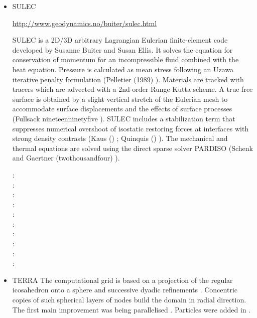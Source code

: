 \begin{itemize}
\item {\codefont SULEC} 

\url{http://www.geodynamics.no/buiter/sulec.html}

SULEC is a 2D/3D arbitrary Lagrangian Eulerian finite-element code developed by Susanne Buiter and Susan Ellis. 
It solves the equation for conservation of momentum for an incompressible fluid combined with 
the heat equation. Pressure is calculated as mean stress following an Uzawa iterative penalty 
formulation (Pelletier \etal (1989) \cite{pefc89}). 
Materials are tracked with tracers which are advected with a 2nd-order Runge-Kutta scheme. 
A true free surface is obtained by a slight vertical stretch of the Eulerian mesh to 
accommodate surface displacements and the effects of surface processes (Fullsack nineteenninetyfive \cite{full95}). 
SULEC includes a stabilization term that suppresses numerical overshoot of isostatic restoring forces 
at interfaces with strong density contrasts (Kaus \etal (\twothousandten) \cite{kamm10}; 
Quinquis \etal (\twothousandeleven) \cite{qube11}). The mechanical and thermal equations are solved using 
the direct sparse solver PARDISO (Schenk and Gaertner (twothousandfour) \cite{scga04}).


\begin{scriptsize}
\twothousandeleven: \cite{qube11}\cite{ellw11}\\
\twothousandtwelve: \cite{buit12}\cite{tebu12}\cite{crsg12}\cite{grel12}\\
\twothousandthirteen: \cite{ghbu13}\\
\twothousandfourteen: \cite{ghbu14}\cite{qubu14}\\
\twothousandfifteen: \cite{nabu15}\\
\twothousandsixteen: \cite{zwsn16}\\
\twothousandseventeen: \cite{nabp17}\\
\twothousandeighteen: \cite{tebu18}\\
\twothousandnineteen: \cite{elgb19}\\
\twothousandtwenty: \cite{pena20}
\end{scriptsize}


\item {\codefont TERRA} 
The computational grid is based on a projection of the regular icosahedron onto a 
sphere and successive dyadic refinements \cite{bafr85}.  Concentric copies of such  
spherical layers of nodes build the domain in radial direction.
The first main improvement was being parallelised \cite{buba95}.
Particles were added in \cite{strb02}.


\end{itemize}
